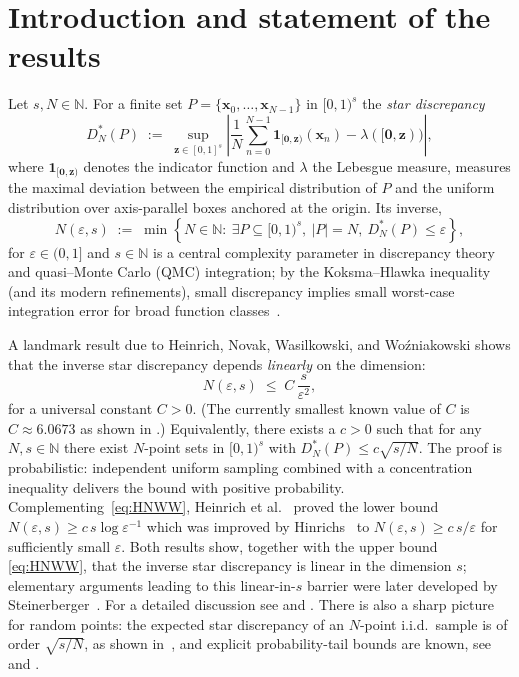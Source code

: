 \documentclass[12pt]{article}
\theoremstyle{definition}
\numberwithin{equation}{section}
\begin{document}
\section{Introduction and statement of the results}
Let $s,N \in \mathbb{N}$. For a finite set $P=\{\bm{x}_0,\dots,\bm{x}_{N-1}\}$ in $[0,1)^s$ the \emph{star discrepancy}
\[
  D^*_N(P) \;:=\; \sup_{\bm{z}\in[0,1]^s}\left|\frac{1}{N}\sum_{n=0}^{N-1} \mathbf{1}_{[\bm{0},\bm{z})}(\bm{x}_n)-\lambda([\bm{0},\bm{z}))\right|,
\]
where $\bm{1}_{[\bm{0},\bm{z})}$ denotes the indicator function and $\lambda$ the Lebesgue measure, measures the maximal deviation between the empirical distribution of $P$ and the uniform distribution over axis-parallel boxes anchored at the origin. Its inverse,
\[
  N(\varepsilon,s) \;:=\; \min\left\{N\in\mathbb{N}:\ \exists P\subseteq [0,1)^s,\ |P|=N,\ D^*_N(P)\le\varepsilon\right\},
\]
for $\varepsilon \in (0,1]$ and $s \in \mathbb{N}$ is a central complexity parameter in discrepancy theory and quasi–Monte Carlo (QMC) integration; by the Koksma–Hlawka inequality (and its modern refinements), small discrepancy implies small worst-case integration error for broad function classes~\cite{AD15,DKP10}.

A landmark result due to Heinrich, Novak, Wasilkowski, and Wo\'zniakowski \cite[Theorem~3]{HNWW01} shows that the inverse star discrepancy depends \emph{linearly} on the dimension:
\begin{equation}\label{eq:HNWW}
  N(\varepsilon,s) \;\le\; C\, \frac{s }{\varepsilon^2},
\end{equation}
for a universal constant $C>0$. (The currently smallest known value of $C$ is $C \approx 6.0673$ as shown in \cite{Wei26}.) Equivalently, there exists a $c>0$ such that for any $N,s\in \mathbb{N}$ there exist $N$-point sets in $[0,1)^s$ with $D^*_N(P)\le c\sqrt{s/N}$. The proof is probabilistic: independent uniform sampling combined with a concentration inequality delivers the bound with positive probability. Complementing~\eqref{eq:HNWW}, Heinrich et al.~\cite[Theorem~8]{HNWW01} proved the lower bound $N(\varepsilon,s)\ge c\, s \log \varepsilon^{-1}$ which was improved by   Hinrichs~\cite{Hin04} to $N(\varepsilon,s)\ge c\, s/\varepsilon$ for sufficiently small $\varepsilon$. Both results show, together with the upper bound \eqref{eq:HNWW}, that the inverse star discrepancy is linear in the dimension $s$; elementary arguments leading to this linear-in-$s$ barrier were later developed by Steinerberger~\cite{Steinerberger22}. For a detailed discussion see \cite[Sec.~3.1.5]{NW08} and \cite[Sec.~9.9]{NW10}.  There is also a sharp picture for random points: the expected star discrepancy of an $N$-point i.i.d.\ sample is of order $\sqrt{s/N}$, as shown in~\cite{Doerr14}, and explicit probability-tail bounds are known, see~\cite{AH14} and \cite{GPW}.
\end{document}
